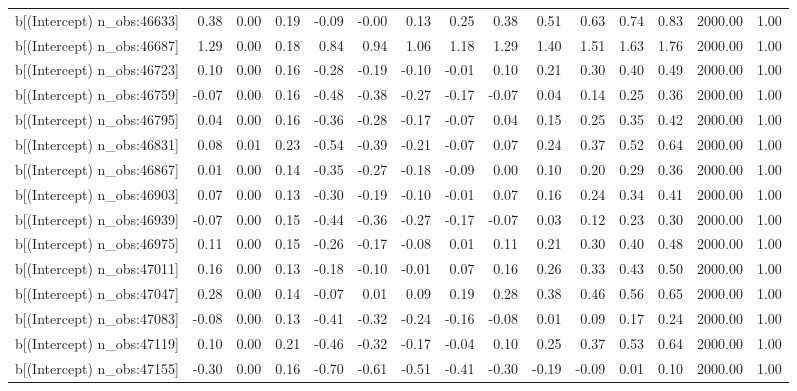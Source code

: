 \begin{table}[ht]
\begin{tabular}{rrrrrrrrrrrrrrr}
  b[(Intercept) n\_obs:46633] & 0.38 & 0.00 & 0.19 & -0.09 & -0.00 & 0.13 & 0.25 & 0.38 & 0.51 & 0.63 & 0.74 & 0.83 & 2000.00 & 1.00 \\ 
  b[(Intercept) n\_obs:46687] & 1.29 & 0.00 & 0.18 & 0.84 & 0.94 & 1.06 & 1.18 & 1.29 & 1.40 & 1.51 & 1.63 & 1.76 & 2000.00 & 1.00 \\ 
  b[(Intercept) n\_obs:46723] & 0.10 & 0.00 & 0.16 & -0.28 & -0.19 & -0.10 & -0.01 & 0.10 & 0.21 & 0.30 & 0.40 & 0.49 & 2000.00 & 1.00 \\ 
  b[(Intercept) n\_obs:46759] & -0.07 & 0.00 & 0.16 & -0.48 & -0.38 & -0.27 & -0.17 & -0.07 & 0.04 & 0.14 & 0.25 & 0.36 & 2000.00 & 1.00 \\ 
  b[(Intercept) n\_obs:46795] & 0.04 & 0.00 & 0.16 & -0.36 & -0.28 & -0.17 & -0.07 & 0.04 & 0.15 & 0.25 & 0.35 & 0.42 & 2000.00 & 1.00 \\ 
  b[(Intercept) n\_obs:46831] & 0.08 & 0.01 & 0.23 & -0.54 & -0.39 & -0.21 & -0.07 & 0.07 & 0.24 & 0.37 & 0.52 & 0.64 & 2000.00 & 1.00 \\ 
  b[(Intercept) n\_obs:46867] & 0.01 & 0.00 & 0.14 & -0.35 & -0.27 & -0.18 & -0.09 & 0.00 & 0.10 & 0.20 & 0.29 & 0.36 & 2000.00 & 1.00 \\ 
  b[(Intercept) n\_obs:46903] & 0.07 & 0.00 & 0.13 & -0.30 & -0.19 & -0.10 & -0.01 & 0.07 & 0.16 & 0.24 & 0.34 & 0.41 & 2000.00 & 1.00 \\ 
  b[(Intercept) n\_obs:46939] & -0.07 & 0.00 & 0.15 & -0.44 & -0.36 & -0.27 & -0.17 & -0.07 & 0.03 & 0.12 & 0.23 & 0.30 & 2000.00 & 1.00 \\ 
  b[(Intercept) n\_obs:46975] & 0.11 & 0.00 & 0.15 & -0.26 & -0.17 & -0.08 & 0.01 & 0.11 & 0.21 & 0.30 & 0.40 & 0.48 & 2000.00 & 1.00 \\ 
  b[(Intercept) n\_obs:47011] & 0.16 & 0.00 & 0.13 & -0.18 & -0.10 & -0.01 & 0.07 & 0.16 & 0.26 & 0.33 & 0.43 & 0.50 & 2000.00 & 1.00 \\ 
  b[(Intercept) n\_obs:47047] & 0.28 & 0.00 & 0.14 & -0.07 & 0.01 & 0.09 & 0.19 & 0.28 & 0.38 & 0.46 & 0.56 & 0.65 & 2000.00 & 1.00 \\ 
  b[(Intercept) n\_obs:47083] & -0.08 & 0.00 & 0.13 & -0.41 & -0.32 & -0.24 & -0.16 & -0.08 & 0.01 & 0.09 & 0.17 & 0.24 & 2000.00 & 1.00 \\ 
  b[(Intercept) n\_obs:47119] & 0.10 & 0.00 & 0.21 & -0.46 & -0.32 & -0.17 & -0.04 & 0.10 & 0.25 & 0.37 & 0.53 & 0.64 & 2000.00 & 1.00 \\ 
  b[(Intercept) n\_obs:47155] & -0.30 & 0.00 & 0.16 & -0.70 & -0.61 & -0.51 & -0.41 & -0.30 & -0.19 & -0.09 & 0.01 & 0.10 & 2000.00 & 1.00 \\ 

\end{tabular}
\end{table}
